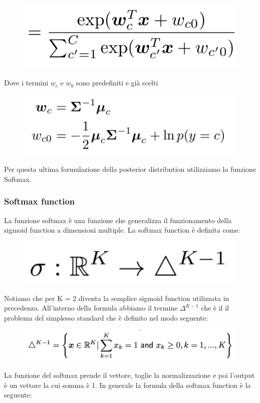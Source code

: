 \documentclass[14pt]{extreport}
\begin{document}
\begin{figure}[H]
\centering
\includegraphics[width=0.4\linewidth]{177.jpeg}
\end{figure}

Dove i termini $w_c$ e $w_0$ sono predefiniti e già scelti
\begin{figure}[H]
\centering
\includegraphics[width=0.4\linewidth]{178.jpeg}
\end{figure}

Per questa ultima formulazione della posterior distribution utilizziamo la funzione Softmax.

\subsubsection{Softmax function}

La funzione softmax è una funzione che generalizza il funzionamento della sigmoid function a dimensioni multiple. La softmax function è definita come:
\begin{figure}[H]
\centering
\includegraphics[width=0.4\linewidth]{179.jpeg}
\end{figure}

Notiamo che per K = 2 diventa la semplice sigmoid function utilizzata in precedenza. All'interno della formula abbiamo il termine $\Delta^{K-1}$ che è
il il problema del simplesso standard che è definito nel modo seguente:

\begin{figure}[H]
\centering
\includegraphics[width=0.5\linewidth]{180.jpeg}
\end{figure}

La funzione del softmax prende il vettore, toglie la normalizzazione e poi l'output è un vettore la cui somma è 1. In generale la formula della
softmax function è la seguente:
\end{document}
